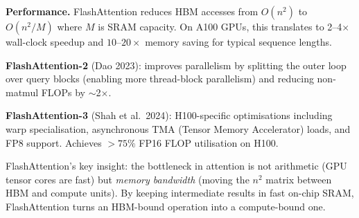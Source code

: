 \textbf{Performance.} FlashAttention reduces HBM accesses from $O(n^2)$ to $O(n^2 / M)$
where $M$ is SRAM capacity. On A100 GPUs, this translates to 2--4$\times$ wall-clock
speedup and $10$--$20\times$ memory saving for typical sequence lengths.

\textbf{FlashAttention-2} (Dao 2023): improves parallelism by splitting the outer loop
over query blocks (enabling more thread-block parallelism) and reducing non-matmul FLOPs
by $\sim$2$\times$.

\textbf{FlashAttention-3} (Shah et al.\ 2024): H100-specific optimisations including
warp specialisation, asynchronous TMA (Tensor Memory Accelerator) loads, and FP8
support. Achieves $>75\%$ FP16 FLOP utilisation on H100.

\begin{intuitionbox}
  FlashAttention's key insight: the bottleneck in attention is not arithmetic (GPU
  tensor cores are fast) but \emph{memory bandwidth} (moving the $n^2$ matrix between
  HBM and compute units). By keeping intermediate results in fast on-chip SRAM,
  FlashAttention turns an HBM-bound operation into a compute-bound one.
\end{intuitionbox}
